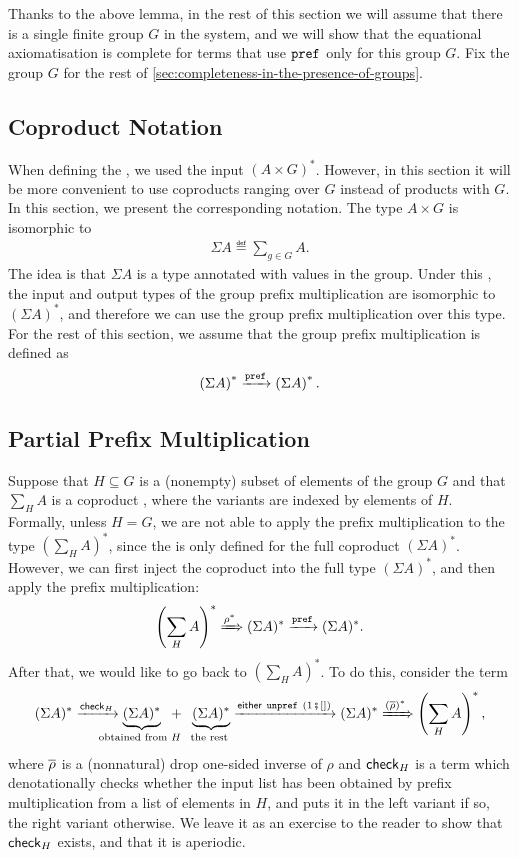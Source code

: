 Thanks to the above lemma, in the rest of this section we will assume that there is a single finite group $G$ in the system, and we will show that the equational axiomatisation is complete for terms that use $\mathtt{pref}$ only for this group $G$. Fix the group $G$ for the rest of \cref{sec:completeness-in-the-presence-of-groups}.

\subsection{Coproduct Notation}

When defining the , we used the input  $(A \times G)^*$. However, in this section it will be more convenient to use coproducts ranging over $G$ instead of products with $G$. In this section, we present the corresponding notation. The type $A \times G$ is isomorphic to 
\begin{align*}
\Sigma A \eqdef \sum_{g \in G}A.
\end{align*}
The idea is that $\Sigma A$ is a type annotated with values in the group.
Under this , the input and output types of the group prefix multiplication are isomorphic to $(\Sigma A)^*$, and therefore we can use the group prefix multiplication over this type. For the rest of this section, we assume that the group prefix multiplication is defined as 
\[
    \left( \Sigma A \right)^* \xrightarrow{\mathtt{pref}} \left( \Sigma A \right)^*.
\]

\subsection{Partial Prefix Multiplication}

Suppose that $H \subseteq G$ is a (nonempty) subset of elements of the group $G$ and that $\sum_H A$ is a coproduct , where the variants are indexed by elements of $H$. Formally, unless $H = G$, we are not able to apply the prefix multiplication to the type $(\sum_H A)^*$, since the  is only defined for the full coproduct $(\Sigma A)^*$. However, we can first inject the coproduct into the full type $(\Sigma A)^*$, and then apply the prefix multiplication: 
\[
    \left( \sum_H A \right)^* \xRightarrow{\rho^*} (\Sigma A)^* \xrightarrow{\mathtt{pref}} (\Sigma A)^*.
\]
After that, we would like to go back to $(\sum_H A)^*$. To do this, consider the term
\[
    (\Sigma A)^* \xrightarrow{\checkterm_H} \myunderbrace{(\Sigma A)^*}{obtained from $H$} \hspace*{2mm} +  \hspace*{2mm} \myunderbrace{(\Sigma A)^*}{the rest} \xrightarrow{\either{\unprefterm}{(1\comp[])}} (\Sigma A)^* \drop{(\inv \rho)^*} \left( \sum_H A \right)^*,
\]
where $\overline \rho$ is a (nonnatural) drop one-sided inverse of $\rho$ and $\mathsf{check}_H$ is a term which denotationally checks whether the input list has been obtained by prefix multiplication from a list of elements in $H$, and puts it in the left variant if so, the right variant otherwise. We leave it as an exercise to the reader to show that $\mathsf{check}_H$ exists, and that it is aperiodic. 


